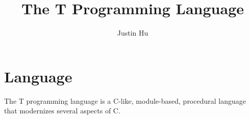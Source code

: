 \documentclass[letterpaper,12pt]{book}
\begin{document}
\title{The T Programming Language}
\author{Justin Hu}
\maketitle
\tableofcontents

\part{Language}

The T programming language is a C-like, module-based, procedural language that modernizes several aspects of C.

\end{document}
